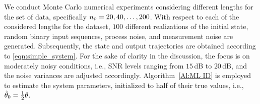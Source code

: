 %
%
We conduct Monte Carlo numerical experiments considering different lengths for the set of data, specifically $\nD = 20, 40, \ldots, 200$. With respect to each of the considered lengths for the dataset, $100$ different realizations of the initial state, random binary input sequences, process noise, and measurement noise are generated. Subsequently, the state and output trajectories are obtained according to \eqref{eqn:simple_system}. 
For the sake of clarity in the discussion, the focus is on moderately noisy conditions, i.e., SNR levels ranging from $15$\,dB to $20$\,dB, and the noise variances are adjusted accordingly.
Algorithm~\ref{Al:ML ID} is employed to estimate the system parameters, initialized to half of their true values, i.e., $\hat{{ \mathrm{\theta} }}_0 = \frac{1}{2}{ \mathrm{\theta} }$.

